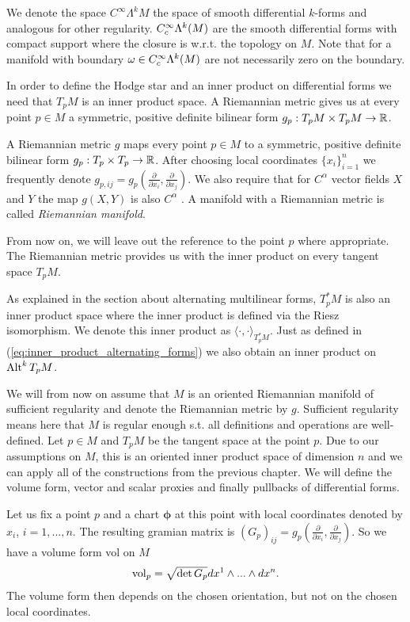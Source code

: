 \documentclass[../master_thesis.tex]{subfiles}
\begin{document}
We denote the space $C^\infty \Lambda^k M$ the 
space of smooth differential $k$-forms and analogous for other regularity.
$C_c^\infty \Lambda^{k}(M)$ are the smooth differential forms
with compact support where the closure is w.r.t. 
the topology on $M$. Note that for a manifold with boundary 
$\omega \in C_c^\infty \Lambda^{k}(M)$ are not necessarily zero on the boundary.

In order to define the Hodge star and an inner product on differential forms
we need that 
$T_p M$ is an inner product space.
A Riemannian metric gives us at every point $p \in M$ 
a symmetric, positive definite bilinear form 
$g_p: T_p M \times T_p M \rightarrow \mathbb{R}$. 
\begin{definition}
    A Riemannian metric $g$ maps every point $p\in M$ to 
    a symmetric, positive definite bilinear form $g_p: T_p \times T_p \rightarrow \mathbb{R}$.
    After choosing local coordinates $\{x_i\}_{i=1}^n$ we frequently denote 
    $g_{p,ij} = g_p(\frac{\partial}{\partial x_i}, \frac{\partial}{\partial x_j})$.
    We also require that for $C^\alpha$ vector fields $X$ and $Y$ the map 
    $g(X,Y)$ is also $C^\alpha$ . 
    A manifold with a Riemannian metric is called 
    \textit{Riemannian manifold}.
\end{definition}
From now on, we will leave out the reference to the point $p$ where appropriate.
The Riemannian metric provides us with the 
inner product on every tangent space $T_p M$. 

As explained in the section about alternating multilinear forms, $T^*_p M$ is also an 
inner product space where the inner product is defined via the Riesz isomorphism.
We denote this inner product as $\langle \cdot, \cdot \rangle _{T^*_p M}$.
Just as defined in (\ref{eq:inner_product_alternating_forms}) 
we also obtain an inner product on 
${\text{Alt}^{k}\,T_p M}$.

We will from now on assume that $M$ is an oriented Riemannian manifold of sufficient 
regularity and denote the Riemannian metric by $g$. 
Sufficient regularity means here that $M$ is regular enough s.t. all definitions and operations 
are well-defined.
Let $p \in M$ and $T_p M$ be the tangent space at the point $p$. 
Due to our assumptions on $M$, this is an oriented inner product space of 
dimension $n$ and we can apply 
all of the constructions from the previous chapter. 
We will define the volume form, vector and scalar proxies and finally pullbacks
of differential forms.

Let us fix a point $p$ and a chart $\boldsymbol{\phi}$ 
at this point with local coordinates denoted by $x_i$, $i=1,...,n$. 
The resulting gramian matrix is
$(G_p)_{ij} = g_p(\frac{\partial}{\partial x_i},\frac{\partial}{\partial x_j})$.
So we have a volume form vol on $M$ 
\begin{align*}
    \operatorname{vol}_p = \sqrt{\det G_p} dx^1 \wedge ... \wedge dx^n.
\end{align*}
The volume form then depends on the chosen orientation, but not on the 
chosen local coordinates.
\end{document}
